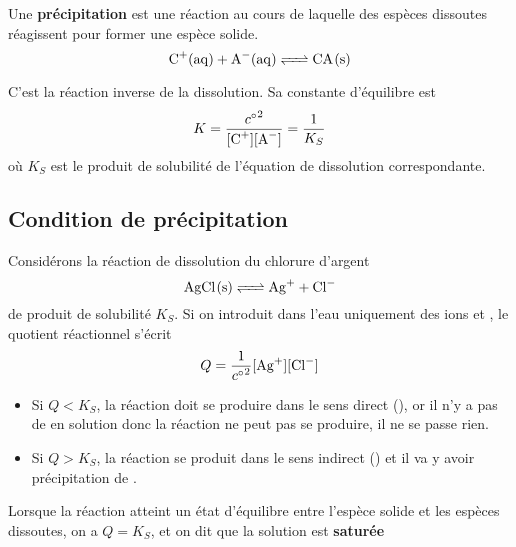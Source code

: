 \documentclass{cours}
\begin{document}
\begin{definition}
 Une \textbf{précipitation} est une réaction au cours de laquelle des espèces dissoutes réagissent pour former une espèce solide.  
  \begin{equation}
    \ce{ C+(aq) + A-(aq) <=> CA(s) }
    \label{eq:precipitation}
  \end{equation}
\end{definition}
C'est la réaction inverse de la dissolution. Sa constante d'équilibre est 
\begin{equation}
  K=\frac{{c^\circ}^2}{[\ce{C+}][\ce{A-}]} = \frac{1}{K_S}
\end{equation}
où $K_S$ est le produit de solubilité de l'équation de dissolution correspondante.

\subsection{Condition de précipitation}%
\label{sub:condition_de_precipitation}
Considérons la réaction de dissolution du chlorure d'argent
\begin{equation}
  \ce{AgCl(s) <=> Ag+ + Cl-}
\end{equation}
de produit de solubilité $K_S$. Si on introduit dans l'eau uniquement des ions  et , le quotient réactionnel s'écrit 
\begin{equation}
  Q = \frac{1}{{c^\circ}^2}[\ce{Ag+}][\ce{Cl-}]
\end{equation}

\begin{itemize}
  \item Si $Q<K_S$, la réaction doit se produire dans le sens direct (\ce{->}), or il n'y a pas de  en solution donc la réaction ne peut pas se produire, il ne se passe rien.
  \item Si $Q>K_S$, la réaction se produit dans le sens indirect (\ce{<-}) et il va y avoir précipitation de .
\end{itemize}

Lorsque la réaction atteint un état d'équilibre entre l'espèce solide et les espèces dissoutes, on a $Q=K_S$, et on dit que la solution est \textbf{saturée} 
\end{document}
